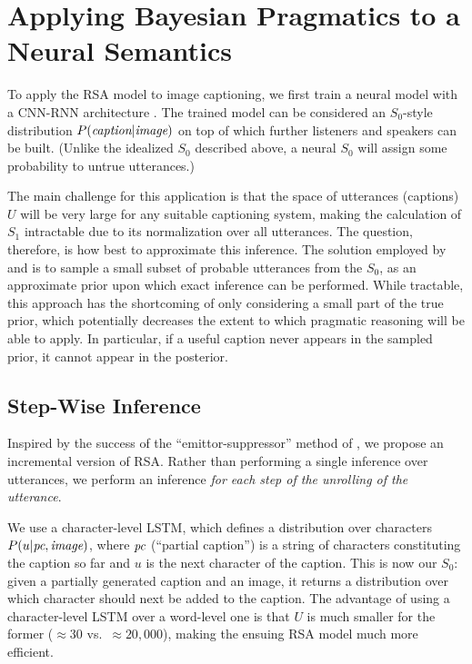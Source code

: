 \documentclass[11pt,a4paper]{article}
\begin{document}
\section{Applying Bayesian Pragmatics to a Neural Semantics}

To apply the RSA model to image captioning, we first train a neural model with a CNN-RNN architecture \cite{karpathy2015deep,vinyals2015show}. The trained model can be considered an $S_{0}$-style distribution $P(\emph{caption}|\emph{image})$
on top of which further listeners and speakers can be built. (Unlike the idealized $S_0$ described above, a neural $S_0$ will assign some probability to untrue utterances.)

The main challenge for this application is that the space of utterances (captions) $U$ will be very large for any suitable captioning system, making the calculation of $S_{1}$ intractable due to its normalization over all utterances.
The question, therefore, is how best to approximate this inference. The solution employed by \citet{monroe2016learning} and \citet{andreas2016reasoning} is to sample a small subset of probable utterances from the $S_0$, as an approximate prior upon which exact inference can be performed. While tractable, this approach has the shortcoming of only considering a small part of the true prior, which potentially decreases the extent to which pragmatic reasoning will be able to apply. In particular, if a useful caption never appears in the sampled prior, it cannot appear in the posterior.

\subsection{Step-Wise Inference}

Inspired by the success of the ``emittor-suppressor'' method of \citet{murphy}, we propose an incremental version of RSA. Rather than performing a single inference over utterances, we perform an inference \emph{for each step of the unrolling of the utterance}. 

We use a character-level LSTM, which defines a distribution over characters $P(u|\emph{pc},\emph{image})$, where $\emph{pc}$ (``partial caption'') is a string of characters constituting the caption so far and $u$ is the next character of the caption. This is now our $S_0$: given a partially generated caption and an image, it returns a distribution over which character should next be added to the caption. The advantage of using a character-level LSTM over a word-level one is that $U$ is much smaller for the former (${\approx}30$ vs.~${\approx}20,000$), making the ensuing RSA model much more efficient.
\end{document}

